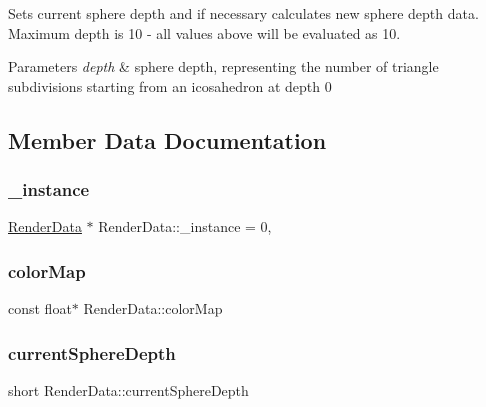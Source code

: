 Sets current sphere depth and if necessary calculates new sphere depth data. Maximum depth is 10 -\/ all values above will be evaluated as 10. 
\begin{DoxyParams}{Parameters}
{\em depth} & sphere depth, representing the number of triangle subdivisions starting from an icosahedron at depth 0 \\
\hline
\end{DoxyParams}


\subsection{Member Data Documentation}
\mbox{\label{class_render_data_a133da67a805762c95284248a7ea1526c}} 
\subsubsection{\texorpdfstring{\+\_\+instance}{\_instance}}
{\footnotesize\ttfamily \hyperlink{class_render_data}{Render\+Data} $\ast$ Render\+Data\+::\+\_\+instance = 0\hspace{0.3cm}{\ttfamily [static]}, {\ttfamily [private]}}

\mbox{\label{class_render_data_a78b66cb01444d2d36c3ed9179705a716}} 
\subsubsection{\texorpdfstring{color\+Map}{colorMap}}
{\footnotesize\ttfamily const float$\ast$ Render\+Data\+::color\+Map\hspace{0.3cm}{\ttfamily [private]}}

\mbox{\label{class_render_data_addeb27eb3a3e9c8bf50a3615fbcc8752}} 
\subsubsection{\texorpdfstring{current\+Sphere\+Depth}{currentSphereDepth}}
{\footnotesize\ttfamily short Render\+Data\+::current\+Sphere\+Depth\hspace{0.3cm}{\ttfamily [private]}}



